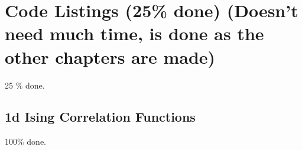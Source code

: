 \chapter{Code Listings (25\% done) (Doesn't need much time, is done as the other chapters are made)}
25 \% done.
\section{1d Ising Correlation Functions \label{sec:corrFnCode} }
100\% done.